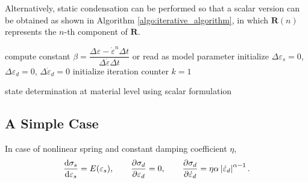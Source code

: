 Alternatively, static condensation can be performed so that a scalar version can be obtained as shown in Algorithm \ref{algo:iterative_algorithm}, in which $\mathbold{R}(n)$ represents the $n$-th component of $\mathbold{R}$.
\begin{algorithm}[htb]\onehalfspacing
{}
compute constant $\beta=\dfrac{\Delta\varepsilon-\dot\varepsilon^n\Delta{}t}{\Delta\dot\varepsilon\Delta{}t}$ or read as model parameter\;
initialize $\Delta\varepsilon_s=0$, $\Delta\varepsilon_d=0$, $\Delta\dot\varepsilon_d=0$\;
initialize iteration counter $k=1$\;
\caption{state determination at material level using scalar formulation}\label{algo:iterative_algorithm}
\end{algorithm}
\subsection{A Simple Case}
In case of nonlinear spring and constant damping coefficient $\eta$,
\begin{gather}
\dfrac{\mathrm{d}\sigma_s}{\mathrm{d}\varepsilon_s}=E(\varepsilon_s),\qquad\dfrac{\partial\sigma_d}{\partial\varepsilon_d}=0,\qquad\dfrac{\partial\sigma_d}{\partial\dot\varepsilon_d}=\eta\alpha\left\lvert\dot\varepsilon_d\right\rvert^{\alpha-1}.
\end{gather}

